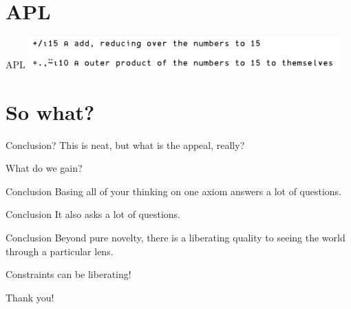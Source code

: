 \documentclass[aspectratio=169]{beamer}
\begin{document}
  \section{APL}
  \begin{frame}{APL}
    \includegraphics[width=12cm]{apl}
  \end{frame}
  \section{So what?}
  \begin{frame}{Conclusion?}
    This is neat, but what is the appeal, really?

    What do we gain?
  \end{frame}
  \begin{frame}{Conclusion}
    Basing all of your thinking on one axiom answers a lot of questions.
  \end{frame}
  \begin{frame}{Conclusion}
    It also asks a lot of questions.
  \end{frame}
  \begin{frame}{Conclusion}
    Beyond pure novelty, there is a liberating quality to seeing the world
    through a particular lens.

    Constraints can be liberating!
  \end{frame}
  \begin{frame}{}
    Thank you!
  \end{frame}
\end{document}
